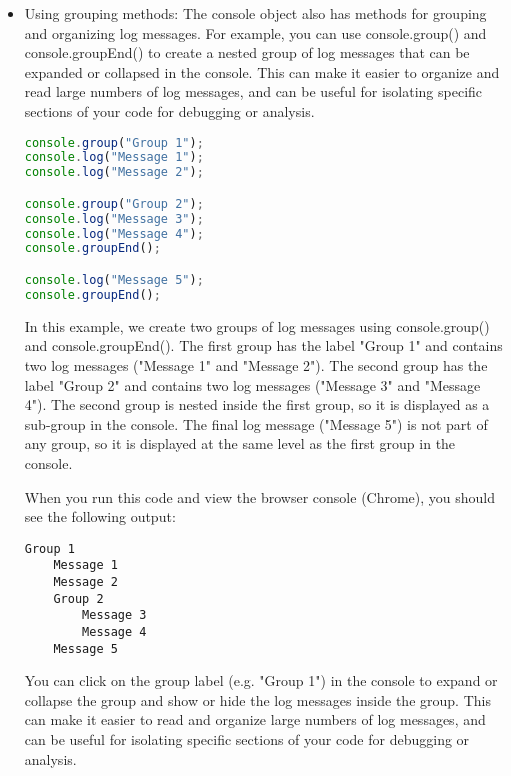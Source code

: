 {\begin{itemize}
\begin{lstlisting}[language=Javascript, caption=Example of console table and dir]
console.table(data);
console.dir(data[0]);

console.time("Time");
// Code to measure goes here
console.timeEnd("Time");
\end{lstlisting}
\item Using grouping methods: The console object also has methods for grouping and organizing log messages. For example, you can use console.group() and console.groupEnd() to create a nested group of log messages that can be expanded or collapsed in the console. This can make it easier to organize and read large numbers of log messages, and can be useful for isolating specific sections of your code for debugging or analysis.

\begin{lstlisting}[language=Javascript, caption=Usage of console.group]
console.group("Group 1");
console.log("Message 1");
console.log("Message 2");

console.group("Group 2");
console.log("Message 3");
console.log("Message 4");
console.groupEnd();

console.log("Message 5");
console.groupEnd();
\end{lstlisting}
In this example, we create two groups of log messages using console.group() and console.groupEnd(). The first group has the label "Group 1" and contains two log messages ("Message 1" and "Message 2"). The second group has the label "Group 2" and contains two log messages ("Message 3" and "Message 4"). The second group is nested inside the first group, so it is displayed as a sub-group in the console. The final log message ("Message 5") is not part of any group, so it is displayed at the same level as the first group in the console.

When you run this code and view the browser console (Chrome), you should see the following output:
\begin{verbatim}
Group 1
    Message 1
    Message 2
    Group 2
        Message 3
        Message 4
    Message 5
\end{verbatim}

You can click on the group label (e.g. "Group 1") in the console to expand or collapse the group and show or hide the log messages inside the group. This can make it easier to read and organize large numbers of log messages, and can be useful for isolating specific sections of your code for debugging or analysis.

\end{itemize}

}
